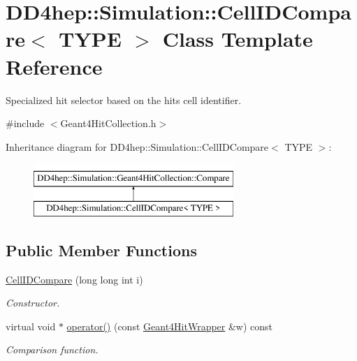 \hypertarget{class_d_d4hep_1_1_simulation_1_1_cell_i_d_compare}{}\section{D\+D4hep\+:\+:Simulation\+:\+:Cell\+I\+D\+Compare$<$ T\+Y\+PE $>$ Class Template Reference}
\label{class_d_d4hep_1_1_simulation_1_1_cell_i_d_compare}


Specialized hit selector based on the hit\textquotesingle{}s cell identifier.  




{\ttfamily \#include $<$Geant4\+Hit\+Collection.\+h$>$}

Inheritance diagram for D\+D4hep\+:\+:Simulation\+:\+:Cell\+I\+D\+Compare$<$ T\+Y\+PE $>$\+:\begin{figure}[H]
\begin{center}
\leavevmode
\includegraphics[height=2.000000cm]{class_d_d4hep_1_1_simulation_1_1_cell_i_d_compare}
\end{center}
\end{figure}
\subsection*{Public Member Functions}
\begin{DoxyCompactItemize}
\item 
\hyperlink{class_d_d4hep_1_1_simulation_1_1_cell_i_d_compare_ad644f00808767564625f5ef98303bf0c}{Cell\+I\+D\+Compare} (long long int i)
\begin{DoxyCompactList}\small\item\em Constructor. \end{DoxyCompactList}\item 
virtual void $\ast$ \hyperlink{class_d_d4hep_1_1_simulation_1_1_cell_i_d_compare_aa652359210477d8353c5f5c530eb9f93}{operator()} (const \hyperlink{class_d_d4hep_1_1_simulation_1_1_geant4_hit_wrapper}{Geant4\+Hit\+Wrapper} \&w) const
\begin{DoxyCompactList}\small\item\em Comparison function. \end{DoxyCompactList}\end{DoxyCompactItemize}
